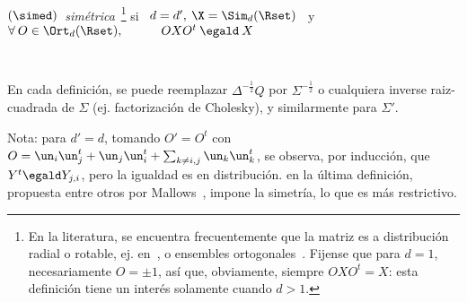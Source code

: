 \begin{definicion}
\

\centerline{$(\simed)  \:$  {\em  sim\'etrica}~\footnote{En  la  literatura,  se
    encuentra frecuentemente que la matriz es a distribuci\'on radial o rotable,
    ej. en~\cite{Tyl82,  BilBre99}, o ensembles  ortogonales~\cite{Car83, Meh04,
      AndGui10, LivNov18}. Fijense que para $d = 1$, necesariamente $O = \pm 1$,
    as\'i que,  obviamente, siempre $O  X O^t =  X$: esta definici\'on  tiene un
    inter\'es solamente cuando $d > 1$.}  si \ $d = d', \: \X = \Sim_d(\Rset)$ \
  y \ $\forall \: O \in \Ort_d(\Rset), \quad\qquad O X O^t \: \egald \: X$}

\

En   cada  definici\'on,   se   puede  reemplazar   $\Delta^{-\frac12}  Q$   por
$\Sigma^{-\frac12}$    o   cualquiera    inverse   raiz-cuadrada    de   $\Sigma$
(ej. factorizaci\'on de Cholesky), y similarmente para $\Sigma'$.
\end{definicion}

Nota: para $d' = d$, tomando $O' =  O^t$ con $O = \un_i \un_j^t + \un_j \un_i^t
+ \sum_{k \ne i,j} \un_k \un_k^t$,  se observa, por inducci\'on, que $Y^t \egald
Y_{j,i}$, pero  la igualdad es  en distribuci\'on. en la  \'ultima definici\'on,
propuesta entre otros por Mallows~\cite{Mal61},  impone la simetr\'ia, lo que es
m\'as restrictivo.

